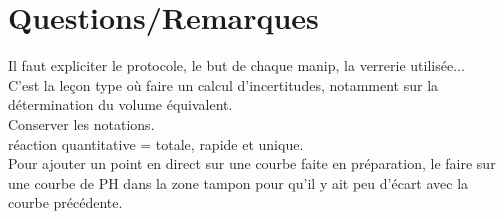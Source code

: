 \documentclass[12pt,prb,aps,epsf]{article}
\begin{document}
 \section*{Questions/Remarques}
 Il faut expliciter le protocole, le but de chaque manip, la verrerie utilisée...\\
 C'est la leçon type où faire un calcul d'incertitudes, notamment sur la détermination du volume équivalent.\\
 Conserver les notations.\\
 réaction quantitative = totale, rapide et unique.\\
 Pour ajouter un point en direct sur une courbe faite en préparation, le faire sur une courbe de PH dans la zone tampon pour qu'il y ait peu d'écart avec la courbe précédente.
 
 
\end{document}
